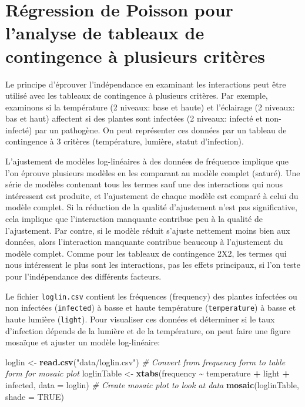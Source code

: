 \documentclass[
  12pt,
]{book}
\newenvironment{Shaded}{\begin{snugshade}}{\end{snugshade}}
\newcommand{\CommentTok}[1]{\textcolor[rgb]{0.56,0.35,0.01}{\textit{#1}}}
\newcommand{\DataTypeTok}[1]{\textcolor[rgb]{0.13,0.29,0.53}{#1}}
\newcommand{\KeywordTok}[1]{\textcolor[rgb]{0.13,0.29,0.53}{\textbf{#1}}}
\newcommand{\NormalTok}[1]{#1}
\newcommand{\OperatorTok}[1]{\textcolor[rgb]{0.81,0.36,0.00}{\textbf{#1}}}
\newcommand{\OtherTok}[1]{\textcolor[rgb]{0.56,0.35,0.01}{#1}}
\newcommand{\StringTok}[1]{\textcolor[rgb]{0.31,0.60,0.02}{#1}}
\begin{document}
\hypertarget{ruxe9gression-de-poisson-pour-lanalyse-de-tableaux-de-contingence-uxe0-plusieurs-crituxe8res}{%
\section{Régression de Poisson pour l'analyse de tableaux de contingence à plusieurs critères}\label{ruxe9gression-de-poisson-pour-lanalyse-de-tableaux-de-contingence-uxe0-plusieurs-crituxe8res}}

Le principe d'éprouver l'indépendance en examinant les interactions peut être utilisé avec les tableaux de contingence à plusieurs critères. Par exemple, examinons si la température (2 niveaux: base et haute) et l'éclairage (2 niveaux: bas et haut) affectent si des plantes sont infectées (2 niveaux: infecté et non-infecté) par un pathogène. On peut représenter ces données par un tableau de contingence à 3 critères (température, lumière, statut d'infection).

L'ajustement de modèles log-linéaires à des données de fréquence implique que l'on éprouve plusieurs modèles en les comparant au modèle complet (saturé). Une série de modèles contenant tous les termes sauf une des interactions qui nous intéressent est produite, et l'ajustement de chaque modèle est comparé à celui du modèle complet. Si la réduction de la qualité d'ajustement n'est pas significative, cela implique que l'interaction manquante contribue peu à la qualité de l'ajustement. Par contre, si le modèle réduit s'ajuste nettement moins bien aux données, alors l'interaction manquante contribue beaucoup à l'ajustement du modèle complet. Comme pour les tableaux de contingence 2X2, les termes qui nous intéressent le plus sont les interactions, pas les effets principaux, si l'on teste pour l'indépendance des différents facteurs.

Le fichier \texttt{loglin.csv} contient les fréquences (frequency) des plantes infectées ou non infectées (\texttt{infected}) à basse et haute température (\texttt{temperature}) à basse et haute lumière (\texttt{light}). Pour visualiser ces données et déterminer si le taux d'infection dépends de la lumière et de la température, on peut faire une figure mosaïque et ajuster un modèle log-linéaire:

\begin{Shaded}
\begin{Highlighting}[]
\NormalTok{loglin \textless{}{-}}\StringTok{ }\KeywordTok{read.csv}\NormalTok{(}\StringTok{"data/loglin.csv"}\NormalTok{)}
\CommentTok{\# Convert from frequency form to table form for mosaic plot}
\NormalTok{loglinTable \textless{}{-}}\StringTok{ }\KeywordTok{xtabs}\NormalTok{(frequency }\OperatorTok{\textasciitilde{}}\StringTok{ }\NormalTok{temperature }\OperatorTok{+}\StringTok{ }\NormalTok{light }\OperatorTok{+}\StringTok{ }\NormalTok{infected, }\DataTypeTok{data =}\NormalTok{ loglin)}
\CommentTok{\# Create mosaic plot to look at data}
\KeywordTok{mosaic}\NormalTok{(loglinTable, }\DataTypeTok{shade =} \OtherTok{TRUE}\NormalTok{)}
\end{Highlighting}
\end{Shaded}
\end{document}
